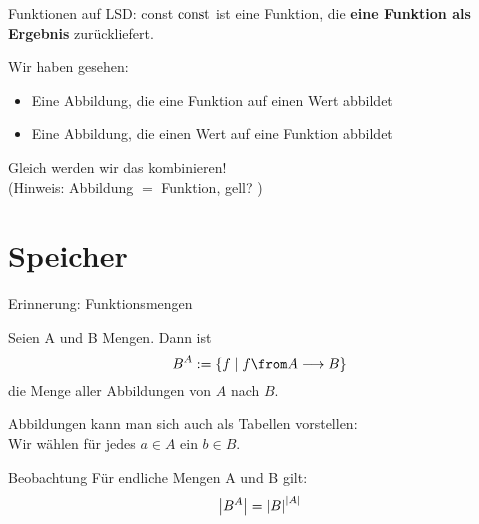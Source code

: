 {\begin{frame}{Funktionen auf LSD: const}
	\impl $\text{const}$ ist eine Funktion, die \textbf{eine Funktion als Ergebnis} zurückliefert.
\end{frame}

\begin{frame}
	Wir haben gesehen:
	\begin{itemize}
		\item Eine Abbildung, die eine Funktion auf einen Wert abbildet
		\item Eine Abbildung, die einen Wert auf eine Funktion abbildet
	\end{itemize}
	Gleich werden wir das kombinieren! \\
	\medskip
	(Hinweis: Abbildung $=$ Funktion, gell? \smiley)
\end{frame}

} %

\section{Speicher}

\begin{frame}{Erinnerung: Funktionsmengen}
	\begin{Definition}
		Seien A und B Mengen. Dann ist $$B^A := \set{f \Mid f \from A \functionto B }$$ die Menge aller Abbildungen von $A$ nach $B$.
	\end{Definition}

	Abbildungen kann man sich auch als Tabellen vorstellen: \\
	Wir wählen für jedes $a \in A$ ein $b \in B$.
	
	\begin{block}{Beobachtung}
		Für endliche Mengen A und B gilt:
		\delimitershortfall=0pt
		$$\left\lvert B^A \right\rvert = \left\lvert B \right\rvert^{\left\lvert A \right\rvert}$$
	\end{block}
\end{frame}


